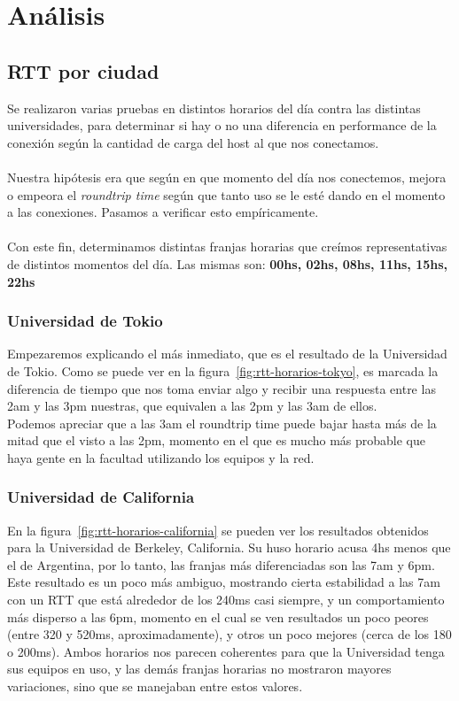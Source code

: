 \section{Análisis}

\subsection{RTT por ciudad}

Se realizaron varias pruebas en distintos horarios del día contra las distintas universidades, para determinar si hay o no una diferencia en performance de la conexión según la cantidad de carga del host al que nos conectamos.\\
\\
\indent Nuestra hipótesis era que según en que momento del día nos conectemos, mejora o empeora el \textit{roundtrip time} según que tanto uso se le esté dando en el momento a las conexiones. Pasamos a verificar esto empíricamente.\\
\\
\indent Con este fin, determinamos distintas franjas horarias que creímos representativas de distintos momentos del día. Las mismas son: \textbf{00hs, 02hs, 08hs, 11hs, 15hs, 22hs}

\subsubsection{Universidad de Tokio}
Empezaremos explicando el más inmediato, que es el resultado de la Universidad de Tokio. Como se puede ver en la figura~\ref{fig:rtt-horarios-tokyo}, es marcada la diferencia de tiempo que nos toma enviar algo y recibir una respuesta entre las 2am y las 3pm nuestras, que equivalen a las 2pm y las 3am de ellos.\\
\indent Podemos apreciar que a las 3am el roundtrip time puede bajar hasta más de la mitad que el visto a las 2pm, momento en el que es mucho más probable que haya gente en la facultad utilizando los equipos y la red.

\subsubsection{Universidad de California}
En la figura~\ref{fig:rtt-horarios-california} se pueden ver los resultados obtenidos para la Universidad de Berkeley, California. Su huso horario acusa 4hs menos que el de Argentina, por lo tanto, las franjas más diferenciadas son las 7am y 6pm.\\
\indent Este resultado es un poco más ambiguo, mostrando cierta estabilidad a las 7am con un RTT que está alrededor de los 240ms casi siempre, y un comportamiento más disperso a las 6pm, momento en el cual se ven resultados un poco peores (entre 320 y 520ms, aproximadamente), y otros un poco mejores (cerca de los 180 o 200ms). Ambos horarios nos parecen coherentes para que la Universidad tenga sus equipos en uso, y las demás franjas horarias no mostraron mayores variaciones, sino que se manejaban entre estos valores.

